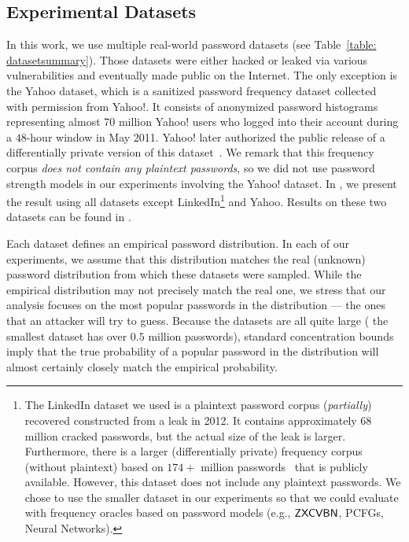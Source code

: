 \vspace{-0.2cm}
\subsection{Experimental Datasets}\label{section:experiment:experiment_dataset} 


In this work, we use multiple real-world password datasets (see Table~\ref{table: datasetsummary}). Those datasets were either hacked or leaked via various vulnerabilities and eventually made public on the Internet. The only exception is the Yahoo dataset, which is a sanitized password frequency dataset collected~\cite{SP:Bonneau12}  with permission from Yahoo!. It consists of anonymized password histograms representing almost 70 million Yahoo! users who logged into their account during a $48$-hour window in May 2011. Yahoo! later authorized the public release of a differentially private version of this dataset~\cite{NDSS:BloDatBon16}. We remark that this frequency corpus \textit{does not contain any plaintext passwords}, so we did not use password strength models in our experiments involving the Yahoo! dataset. In , we present the result using all datasets except LinkedIn\footnote{The LinkedIn dataset we used is a plaintext password corpus (\textit{partially}) recovered constructed from a leak in 2012. It contains approximately $68$ million cracked passwords, but the actual size of the leak is larger. Furthermore, there is a larger (differentially private) frequency corpus (without plaintext) based on $174+$ million passwords~\cite{harsha2020bicycle} that is publicly available. However, this dataset does not include any plaintext passwords. We chose to use the smaller dataset in our experiments so that we could evaluate with frequency oracles based on password models (e.g., $\mathsf{ZXCVBN}$, PCFGs, Neural Networks).}  and Yahoo. Results on these two datasets can be found in .

Each dataset defines an empirical password distribution. In each of our experiments, we assume that this distribution matches the real (unknown) password distribution from which these datasets were sampled. While the empirical distribution may not precisely match the real one, we stress that our analysis focuses on the most popular passwords in the distribution --- the ones that an attacker will try to guess. Because the datasets are all quite large ( the smallest dataset has over $0.5$ million passwords), standard concentration bounds imply that the true probability of a popular password in the distribution will almost certainly closely match the empirical probability.


